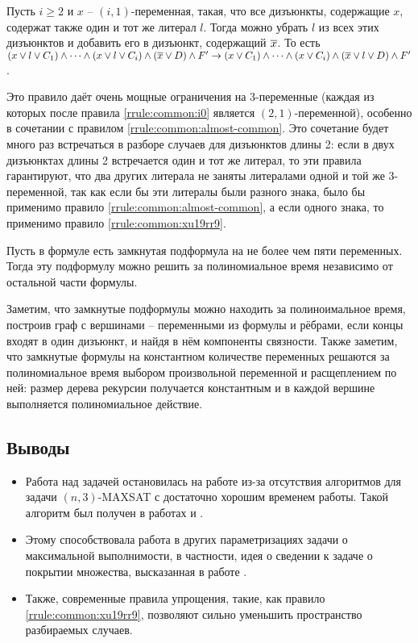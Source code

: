 \begin{rrule}
 Пусть $i \geq 2$ и $x$ -- $(i,1)$-переменная, такая, что все дизъюнкты, содержащие $x$, содержат также один и тот же литерал $l$. Тогда можно убрать $l$ из всех этих дизъюнктов и добавить его в дизъюнкт, содержащий $\overline{x}$. То есть $(x \vee l \vee C_1) \wedge \dots \wedge (x \vee l \vee C_i) \wedge (\overline{x} \vee D) \wedge F' \rightarrow (x \vee C_1) \wedge \dots \wedge (x \vee C_i) \wedge (\overline{x} \vee l \vee D) \wedge F'$.
 \label{rrule:common:xu19rr9}
\end{rrule}

Это правило даёт очень мощные ограничения на 3-переменные (каждая из которых после правила \ref{rrule:common:i0} является $(2,1)$-переменной), особенно в сочетании с правилом \ref{rrule:common:almost-common}. Это сочетание будет много раз встречаться в разборе случаев для дизъюнктов длины 2: если в двух дизъюнктах длины 2 встречается один и тот же литерал, то эти правила гарантируют, что два других литерала не заняты литералами одной и той же 3-переменной, так как если бы эти литералы были разного знака, было бы применимо правило \ref{rrule:common:almost-common}, а если одного знака, то применимо правило \ref{rrule:common:xu19rr9}.

\begin{rrule}
 Пусть в формуле есть замкнутая подформула на не более чем пяти переменных. Тогда эту подформулу можно решить за полиномиальное время независимо от остальной части формулы.
 \label{rrule:common:closed}
\end{rrule}

Заметим, что замкнутые подформулы можно находить за полиноимальное время, построив граф с вершинами -- переменными из формулы и рёбрами, если концы входят в один дизъюнкт, и найдя в нём компоненты связности. Также заметим, что замкнутые формулы на константном количестве переменных решаются за полиномиальное время выбором произвольной переменной и расщеплением по ней: размер дерева рекурсии получается константным и в каждой вершине выполняется полиномиальное действие.

\subsection{Выводы}
\label{subsec:literature-review:summary}

\begin{itemize}
 \item Работа над задачей остановилась на работе \cite{bansal99} из-за отсутствия алгоритмов для задачи $(n,3)$-MAXSAT с достаточно хорошим временем работы. Такой алгоритм был получен в работах \cite{li2017improved} и \cite{belova18}.
 \item Этому способствовала работа в других параметризациях задачи о максимальной выполнимости, в частности, идея о сведении к задаче о покрытии множества, высказанная в работе \cite{bliznets12}.
 \item Также, современные правила упрощения, такие, как правило \ref{rrule:common:xu19rr9}, позволяют сильно уменьшить пространство разбираемых случаев.
\end{itemize}

